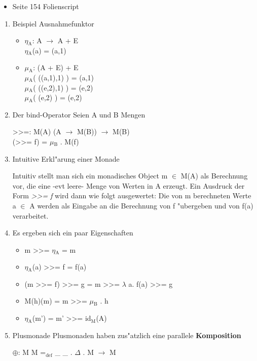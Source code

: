 \documentclass[11pt]{article}
\begin{document}
\begin{itemize}
\item Seite 154 Folienscript
\end{itemize}

\begin{enumerate}
\item Beispiel Ausnahmefunktor
\label{sec-5-2-4-1}

\begin{itemize}
\item $\eta$$_{\text{A}}$: A $\to$ A + E \\ $\eta$$_{\text{A}}$(a) = (a,1)
\item $\mu$$_{\text{A}}$: (A + E) + E \\ $\mu$$_{\text{A}}$( ((a,1),1) ) = (a,1) \\ $\mu$$_{\text{A}}$( ((e,2),1) ) = (e,2) \\ $\mu$$_{\text{A}}$( (e,2) ) = (e,2)
\end{itemize}

\item Der bind-Operator
\label{sec-5-2-4-2}
Seien A und B Mengen

\begin{center}
>>=: M(A) \texttimes{} (A $\to$ M(B)) $\to$ M(B) \\
(>>= f) = $\mu$$_{\text{B}}$ . M(f)
\end{center}

\item Intuitive Erkl"arung einer Monade
\label{sec-5-2-4-3}

Intuitiv stellt man sich ein monadisches Object m $\in$ M(A) als Berechnung vor, die eine -evt leere- Menge von Werten in A erzeugt. 
Ein Ausdruck der Form \emph{>>= f} wird dann wie folgt ausgewertet: Die von m berechneten Werte a $\in$ A werden als Eingabe an die Berechnung
von f "ubergeben und von f(a) verarbeitet.

\item Es ergeben sich ein paar Eigenschaften
\label{sec-5-2-4-4}
\begin{itemize}
\item m >>= $\eta$$_{\text{A}}$ = m
\item $\eta$$_{\text{A}}$(a) >>= f = f(a)
\item (m >>= f) >>= g = m >>= $\lambda$ a. f(a) >>= g
\item M(h)(m) = m >>= $\mu$$_{\text{B}}$ . h
\item $\eta$$_{\text{A}}$(m') = m' >>= id$_{\text{M}}$(A)
\end{itemize}

\item Plusmonade
\label{sec-5-2-4-5}
Plusmonaden haben zus"atzlich eine parallele \textbf{Komposition}
\begin{center}
$\oplus$: M \texttimes{} M =$_{\text{def}}$ \_ \texttimes{} \_ . $\Delta$ . M $\to$ M
\end{center}
\end{enumerate}
\end{document}
